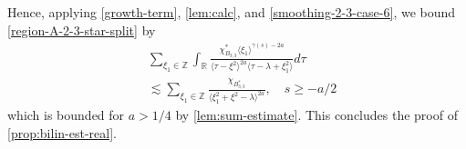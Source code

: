\documentclass[12pt,reqno]{amsart}
\numberwithin{equation}{section}  %
\numberwithin{figure}{section}
\newcommand{\rr}{\mathbb{R}}
\newcommand{\zz}{\mathbb{Z}}
\theoremstyle{plain}
\theoremstyle{definition}
\theoremstyle{remark}
\begin{document}
Hence, applying
\eqref{growth-term}, \autoref{lem:calc}, and
\eqref{smoothing-2-3-case-6}, we bound \eqref{region-A-2-3-star-split} by
%
%
\begin{equation*}
\begin{split}
   & \sum_{\xi_{1} \in \zz} \int_{\rr} \frac{\chi^{*}_{B_{3,3}} \langle
   \xi_{1} \rangle ^{\gamma(s) -2a}
    }{ \langle  \tau  - \xi^{2}
    \rangle ^{2a}   \langle  \tau - \lambda+\xi_{1}^{2}
\rangle } d \tau
\\
& \lesssim  \sum_{\xi_{1} \in \zz} \frac{\chi_{B_{3,3}^{*}}}{\langle \xi_{1}^{2} +
\xi^{2} - \lambda \rangle^{2 a} }, \quad s \ge -a/2
\end{split}
\end{equation*}
which is bounded for $a > 1/4$ by
\autoref{lem:sum-estimate}. This concludes the proof of \autoref{prop:bilin-est-real}. \qquad \qedsymbol
%
%
\newpage
\appendix
\section{}
\end{document}
